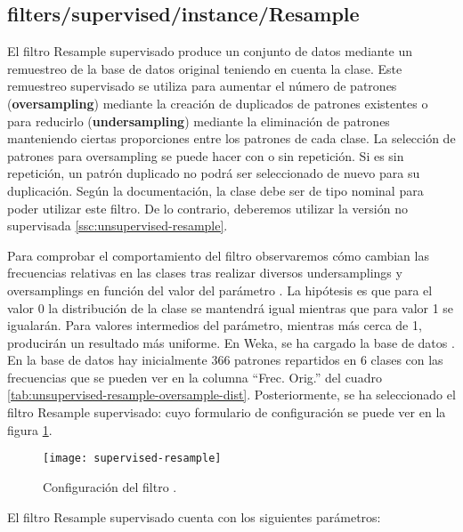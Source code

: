 \subsection{filters/supervised/instance/Resample}
\label{ssc:supervised-resample}
El filtro Resample supervisado produce un conjunto de datos mediante un remuestreo de la base de datos original teniendo en cuenta la clase. Este remuestreo supervisado se utiliza para aumentar el número de patrones (\textbf{oversampling}) mediante la creación de duplicados de patrones existentes o para reducirlo (\textbf{undersampling}) mediante la eliminación de patrones manteniendo ciertas proporciones entre los patrones de cada clase. La selección de patrones para oversampling se puede hacer con o sin repetición. Si es sin repetición, un patrón duplicado no podrá ser seleccionado de nuevo para su duplicación. Según la documentación, la clase debe ser de tipo nominal para poder utilizar este filtro. De lo contrario, deberemos utilizar la versión no supervisada \ref{ssc:unsupervised-resample}.

Para comprobar el comportamiento del filtro observaremos cómo cambian las frecuencias relativas en las clases tras realizar diversos undersamplings y oversamplings en función del valor del parámetro . La hipótesis es que para el valor 0 la distribución de la clase se mantendrá igual mientras que para valor 1 se igualarán. Para valores intermedios del parámetro, mientras más cerca de 1, producirán un resultado más uniforme. En Weka, se ha cargado la base de datos . En la base de datos hay inicialmente 366 patrones repartidos en 6 clases con las frecuencias que se pueden ver en la columna ``Frec. Orig.'' del cuadro \ref{tab:unsupervised-resample-oversample-dist}. Posteriormente, se ha seleccionado el filtro Resample supervisado:  cuyo formulario de configuración se puede ver en la figura \ref{fig:supervised-resample}.

\begin{figure}[ht]
    \centering
    \texttt{[image: supervised-resample]}
    \caption{Configuración del filtro .}
    \label{fig:supervised-resample}
\end{figure}
El filtro Resample supervisado cuenta con los siguientes parámetros:

